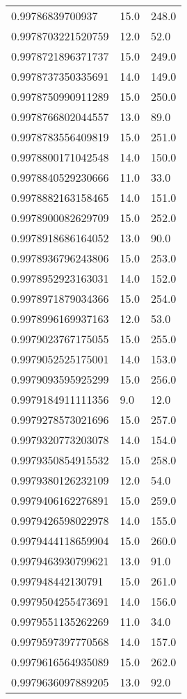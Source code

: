 \begin{center}
\begin{supertabular}[H]{p{0.30\textwidth}p{0.05\textwidth}p{0.05\textwidth}}
0.99786839700937 & 15.0 & 248.0 \\ 
0.9978703221520759 & 12.0 & 52.0 \\ 
0.9978721896371737 & 15.0 & 249.0 \\ 
0.9978737350335691 & 14.0 & 149.0 \\ 
0.9978750990911289 & 15.0 & 250.0 \\ 
0.9978766802044557 & 13.0 & 89.0 \\ 
0.9978783556409819 & 15.0 & 251.0 \\ 
0.9978800171042548 & 14.0 & 150.0 \\ 
0.9978840529230666 & 11.0 & 33.0 \\ 
0.9978882163158465 & 14.0 & 151.0 \\ 
0.9978900082629709 & 15.0 & 252.0 \\ 
0.9978918686164052 & 13.0 & 90.0 \\ 
0.9978936796243806 & 15.0 & 253.0 \\ 
0.9978952923163031 & 14.0 & 152.0 \\ 
0.9978971879034366 & 15.0 & 254.0 \\ 
0.9978996169937163 & 12.0 & 53.0 \\ 
0.9979023767175055 & 15.0 & 255.0 \\ 
0.9979052525175001 & 14.0 & 153.0 \\ 
0.9979093595925299 & 15.0 & 256.0 \\ 
0.9979184911111356 & 9.0 & 12.0 \\ 
0.9979278573021696 & 15.0 & 257.0 \\ 
0.9979320773203078 & 14.0 & 154.0 \\ 
0.9979350854915532 & 15.0 & 258.0 \\ 
0.9979380126232109 & 12.0 & 54.0 \\ 
0.9979406162276891 & 15.0 & 259.0 \\ 
0.9979426598022978 & 14.0 & 155.0 \\ 
0.9979444118659904 & 15.0 & 260.0 \\ 
0.9979463930799621 & 13.0 & 91.0 \\ 
0.997948442130791 & 15.0 & 261.0 \\ 
0.9979504255473691 & 14.0 & 156.0 \\ 
0.9979551135262269 & 11.0 & 34.0 \\ 
0.9979597397770568 & 14.0 & 157.0 \\ 
0.9979616564935089 & 15.0 & 262.0 \\ 
0.9979636097889205 & 13.0 & 92.0 \\ 

\end{supertabular}
\end{center}
